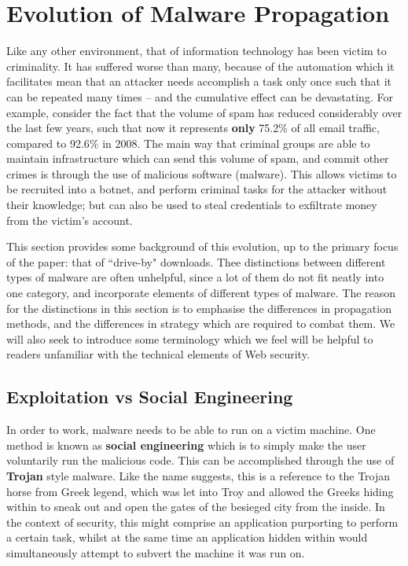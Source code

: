 \documentclass{acm_proc_article-sp}
\begin{document}
\section{Evolution of Malware Propagation}
Like any other environment, that of information technology has been victim to criminality.  It has suffered worse than many, because of the automation which it facilitates mean that an attacker needs accomplish a task only once such that it can be repeated many times -- and the cumulative effect can be devastating.  For example, consider the fact that the volume of spam has reduced considerably over the last few years, such that now it represents \textbf{only} 75.2\% of all email traffic, compared to 92.6\% in 2008\cite{trustwave}.  The main way that criminal groups are able to maintain infrastructure which can send this volume of spam, and commit other crimes is through the use of malicious software (malware).  This allows victims to be recruited into a botnet, and perform criminal tasks for the attacker without their knowledge; but can also be used to steal credentials to exfiltrate money from the victim's account.

This section provides some background of this evolution, up to the primary focus of the paper: that of ``drive-by" downloads.  Thee distinctions between different types of malware are often unhelpful, since a lot of them do not fit neatly into one category, and incorporate elements of different types of malware.  The reason for the distinctions in this section is to emphasise the differences in propagation methods, and the differences in strategy which are required to combat them.  We will also seek to introduce some terminology which we feel will be helpful to readers unfamiliar with the technical elements of Web security.

\subsection{Exploitation vs Social Engineering}
In order to work, malware needs to be able to run on a victim machine.  One method is known as \textbf{social engineering} which is to simply make the user voluntarily run the malicious code.  This can be accomplished through the use of \textbf{Trojan} style malware.  Like the name suggests, this is a reference to the Trojan horse from Greek legend, which was let into Troy and allowed the Greeks hiding within to sneak out and open the gates of the besieged city from the inside.  In the context of security, this might comprise an application purporting to perform a certain task, whilst at the same time an application hidden within would simultaneously attempt to subvert the machine it was run on.
\end{document}
